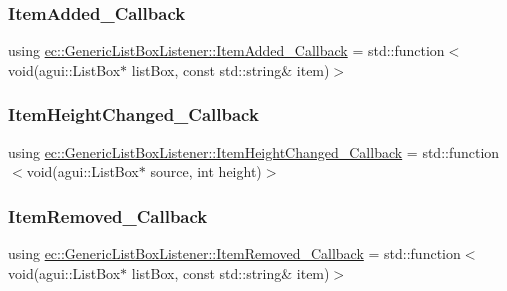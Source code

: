 \subsubsection{\texorpdfstring{Item\+Added\+\_\+\+Callback}{ItemAdded\_Callback}}
{\footnotesize\ttfamily using \mbox{\hyperlink{classec_1_1_generic_list_box_listener_a9dcfd35af8971efa652ced675ac1f28d}{ec\+::\+Generic\+List\+Box\+Listener\+::\+Item\+Added\+\_\+\+Callback}} =  std\+::function$<$void(agui\+::\+List\+Box$\ast$ list\+Box, const std\+::string\& item)$>$}

\mbox{\label{classec_1_1_generic_list_box_listener_aaba7b764c07b0c7cffd9b880bdf46358}} 
\subsubsection{\texorpdfstring{Item\+Height\+Changed\+\_\+\+Callback}{ItemHeightChanged\_Callback}}
{\footnotesize\ttfamily using \mbox{\hyperlink{classec_1_1_generic_list_box_listener_aaba7b764c07b0c7cffd9b880bdf46358}{ec\+::\+Generic\+List\+Box\+Listener\+::\+Item\+Height\+Changed\+\_\+\+Callback}} =  std\+::function$<$void(agui\+::\+List\+Box$\ast$ source, int height)$>$}

\mbox{\label{classec_1_1_generic_list_box_listener_a7a6dd56abe801f89877e1776666a5b11}} 
\subsubsection{\texorpdfstring{Item\+Removed\+\_\+\+Callback}{ItemRemoved\_Callback}}
{\footnotesize\ttfamily using \mbox{\hyperlink{classec_1_1_generic_list_box_listener_a7a6dd56abe801f89877e1776666a5b11}{ec\+::\+Generic\+List\+Box\+Listener\+::\+Item\+Removed\+\_\+\+Callback}} =  std\+::function$<$void(agui\+::\+List\+Box$\ast$ list\+Box, const std\+::string\& item)$>$}

